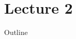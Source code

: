 \documentclass{beamer}
\begin{document}
\part{Lecture 2}

\begin{frame}
\titlepage
\resetonslide
\end{frame}




\begin{frame}{Outline}
	\tableofcontents[part=2]
\end{frame}
\end{document}
